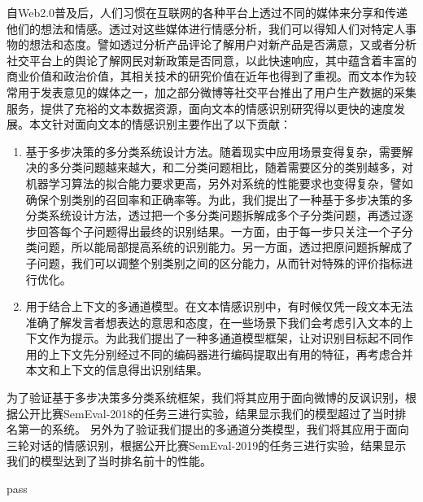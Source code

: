 \begin{cabstract}

自Web2.0普及后，人们习惯在互联网的各种平台上透过不同的媒体来分享和传递他们的想法和情感。透过对这些媒体进行情感分析，我们可以得知人们对特定人事物的想法和态度。譬如透过分析产品评论了解用户对新产品是否满意，又或者分析社交平台上的舆论了解网民对新政策是否同意，以此快速响应，其中蕴含着丰富的商业价值和政治价值，其相关技术的研究价值在近年也得到了重视。而文本作为较常用于发表意见的媒体之一，加之部分微博等社交平台推出了用户生产数据的采集服务，提供了充裕的文本数据资源，面向文本的情感识别研究得以更快的速度发展。本文针对面向文本的情感识别主要作出了以下贡献：

\begin{enumerate}

\item 基于多步决策的多分类系统设计方法。随着现实中应用场景变得复杂，需要解决的多分类问题越来越大，和二分类问题相比，随着需要区分的类别越多，对机器学习算法的拟合能力要求更高，另外对系统的性能要求也变得复杂，譬如确保个别类别的召回率和正确率等。为此，我们提出了一种基于多步决策的多分类系统设计方法，透过把一个多分类问题拆解成多个子分类问题，再透过逐步回答每个子问题得出最终的识别结果。一方面，由于每一步只关注一个子分类问题，所以能局部提高系统的识别能力。另一方面，透过把原问题拆解成了子问题，我们可以调整个别类别之间的区分能力，从而针对特殊的评价指标进行优化。

\item 用于结合上下文的多通道模型。在文本情感识别中，有时候仅凭一段文本无法准确了解发言者想表达的意思和态度，在一些场景下我们会考虑引入文本的上下文作为提示。为此我们提出了一种多通道模型框架，让对识别目标起不同作用的上下文先分别经过不同的编码器进行编码提取出有用的特征，再考虑合并本文和上下文的信息得出识别结果。

\end{enumerate}

为了验证基于多步决策多分类系统框架，我们将其应用于面向微博的反讽识别，根据公开比赛SemEval-2018的任务三进行实验，结果显示我们的模型超过了当时排名第一的系统。
另外为了验证我们提出的多通道分类模型，我们将其应用于面向三轮对话的情感识别，根据公开比赛SemEval-2019的任务三进行实验，结果显示我们的模型达到了当时排名前十的性能。


\end{cabstract}


\begin{eabstract}
   
   pass

\end{eabstract}

